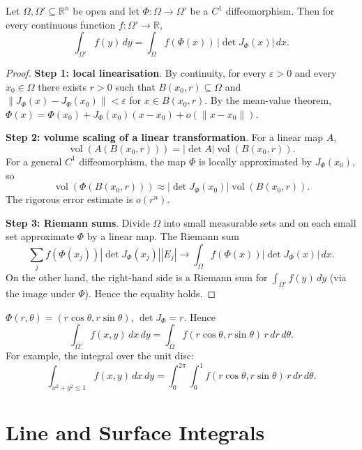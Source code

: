 \begin{theorem}\label{thm:change_of_variables_ra}
Let $\Omega, \Omega' \subseteq \mathbb{R}^n$ be open and let $\Phi: \Omega \to \Omega'$ be a $C^1$ diffeomorphism. Then for every continuous function $f: \Omega' \to \mathbb{R}$,
\[
\int_{\Omega'} f(y) \, dy = \int_{\Omega} f(\Phi(x)) \, |\det J_\Phi(x)| \, dx.
\]
\end{theorem}

\begin{proof}
\textbf{Step 1: local linearisation}. By continuity, for every $\varepsilon > 0$ and every $x_0 \in \Omega$ there exists $r > 0$ such that $B(x_0, r) \subseteq \Omega$ and $\|J_\Phi(x) - J_\Phi(x_0)\| < \varepsilon$ for $x \in B(x_0, r)$. By the mean-value theorem, $\Phi(x) = \Phi(x_0) + J_\Phi(x_0)(x - x_0) + o(\|x - x_0\|)$.

\textbf{Step 2: volume scaling of a linear transformation}. For a linear map $A$,
\[
\operatorname{vol}(A(B(x_0, r))) = |\det A| \operatorname{vol}(B(x_0, r)).
\]
For a general $C^1$ diffeomorphism, the map $\Phi$ is locally approximated by $J_\Phi(x_0)$, so
\[
\operatorname{vol}(\Phi(B(x_0, r))) \approx |\det J_\Phi(x_0)| \operatorname{vol}(B(x_0, r)).
\]
The rigorous error estimate is $o(r^n)$.

\textbf{Step 3: Riemann sums}. Divide $\Omega$ into small measurable sets and on each small set approximate $\Phi$ by a linear map. The Riemann sum
\[
\sum_j f(\Phi(x_j)) |\det J_\Phi(x_j)| |E_j| \to \int_\Omega f(\Phi(x)) |\det J_\Phi(x)| \, dx.
\]
On the other hand, the right-hand side is a Riemann sum for $\int_{\Omega'} f(y) \, dy$ (via the image under $\Phi$). Hence the equality holds.
\end{proof}

\begin{example}\label{ex:polar_integral}
$\Phi(r, \theta) = (r \cos\theta, r \sin\theta)$, $\det J_\Phi = r$. Hence
\[
\int_{\Omega'} f(x, y) \, dx \, dy = \int_{\Omega} f(r \cos\theta, r \sin\theta) \, r \, dr \, d\theta.
\]
For example, the integral over the unit disc:
\[
\int_{x^2 + y^2 \le 1} f(x, y) \, dx \, dy = \int_0^{2\pi} \int_0^1 f(r \cos\theta, r \sin\theta) \, r \, dr \, d\theta.
\]
\end{example}

\section{Line and Surface Integrals}

